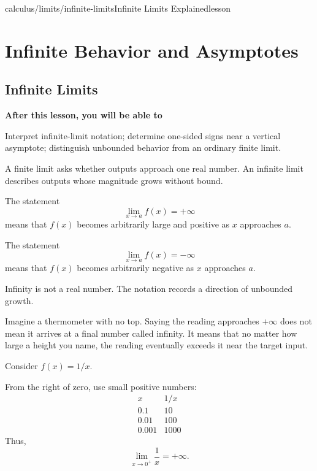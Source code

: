 \documentclass[11pt,openany]{book}
\theoremstyle{bgplain}
\newcommand{\lessonobjective}[1]{%
  \par\Needspace{4\baselineskip}\addvspace{0.6em}%
  {\bfseries\color{BGInk}After this lesson, you will be able to}\par\smallskip
  #1\par\addvspace{0.5em}%
}
\begin{document}
\begin{webpage}{calculus/limits/infinite-limits}{Infinite Limits Explained}{lesson}
\chapter{Infinite Behavior and Asymptotes}

\section{Infinite Limits}

\lessonobjective{
Interpret infinite-limit notation; determine one-sided signs near a vertical asymptote; distinguish unbounded behavior from an ordinary finite limit.
}

A finite limit asks whether outputs approach one real number. An infinite limit describes outputs whose magnitude grows without bound.

\begin{bgdefinition}[title={Infinite-Limit Notation}]
The statement
\[
  \lim_{x\to a}f(x)=+\infty
\]
means that \(f(x)\) becomes arbitrarily large and positive as \(x\) approaches \(a\).

The statement
\[
  \lim_{x\to a}f(x)=-\infty
\]
means that \(f(x)\) becomes arbitrarily negative as \(x\) approaches \(a\).
\end{bgdefinition}

Infinity is not a real number. The notation records a direction of unbounded growth.

\begin{bgconcept}
Imagine a thermometer with no top. Saying the reading approaches \(+\infty\) does not mean it arrives at a final number called infinity. It means that no matter how large a height you name, the reading eventually exceeds it near the target input.
\end{bgconcept}

\begin{bgguided}[title={\(1/x\) near zero}]
Consider \(f(x)=1/x\).

From the right of zero, use small positive numbers:
\[
\begin{array}{c|c}
x&1/x\\
\hline
0.1&10\\
0.01&100\\
0.001&1000
\end{array}
\]
Thus,
\[
  \lim_{x\to0^+}\frac1x=+\infty.
\]


\end{bgguided}
\end{webpage}
\end{document}
